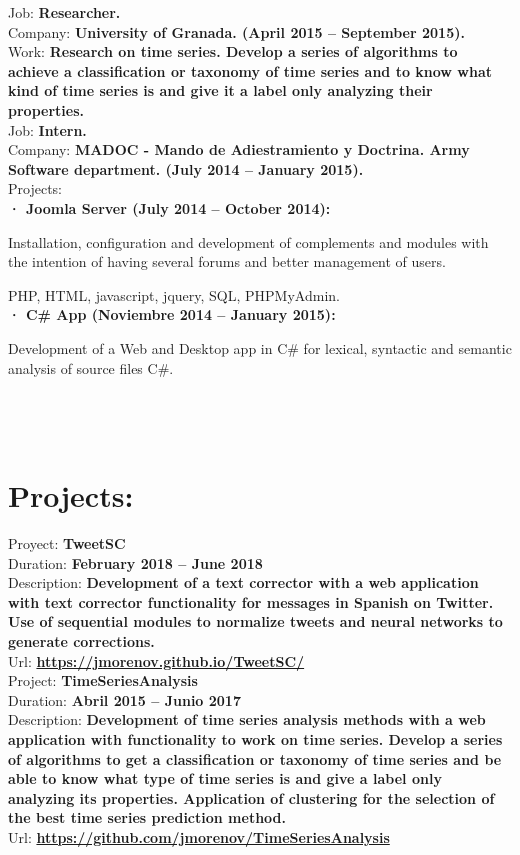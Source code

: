 \documentclass	[10pt,a4paper,oneside]{article}
\newcommand{\seccion}[1]{\vspace*{3mm}\section*{#1}\vspace*{-3mm}}
\begin{document}
Job: \textbf{Researcher.}\\
Company: \textbf{University of Granada. (April 2015 – September 2015).}\\
Work: \textbf{Research on time series. Develop a series of algorithms to achieve a classification or taxonomy of time series and to know what kind of time series is and give it a label only analyzing their properties.}\\

\newpage
Job: \textbf{Intern.}\\
Company: \textbf{MADOC - Mando de Adiestramiento y Doctrina. Army Software department. (July 2014 – January 2015).}\\
Projects:\\
\hspace*{1cm}\textbf{· Joomla Server (July 2014 – October 2014):}\par
{\addtolength{\leftskip}{2cm}Installation, configuration and development of complements and modules with the intention of having several forums and better management of users.\par}
\hspace*{2cm}PHP, HTML, javascript, jquery, SQL, PHPMyAdmin.\\
\hspace*{1cm}\textbf{· C\# App (Noviembre 2014 – January 2015):}\par
{\addtolength{\leftskip}{2cm}
Development of a Web and Desktop app in C\# for lexical, syntactic and semantic analysis of source files C\#.\\\\\\\\\par}

\seccion{Projects:}

Proyect: \textbf{TweetSC}\\
Duration: \textbf{February 2018 – June 2018}\\
Description: \textbf{Development of a text corrector with a web application with text corrector functionality for messages in Spanish on Twitter. Use of sequential modules to normalize tweets and neural networks to generate corrections.}\\
Url: \textbf{\url{https://jmorenov.github.io/TweetSC/}}\\

Project: \textbf{TimeSeriesAnalysis}\\
Duration: \textbf{Abril 2015 – Junio 2017}\\
Description: \textbf{Development of time series analysis methods with a web application with functionality to work on time series. Develop a series of algorithms to get a classification or taxonomy of time series and be able to know what type of time series is and give a label only analyzing its properties. Application of clustering for the selection of the best time series prediction method.}\\
Url: \textbf{\url{https://github.com/jmorenov/TimeSeriesAnalysis}}
\end{document}
